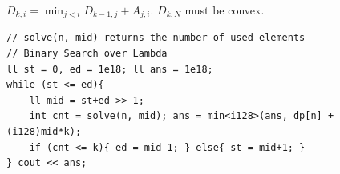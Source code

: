$D_{k,i} = \min_{j<i} D_{k-1,j} + A_{j,i}$. $D_{k,N}$ must be convex.

\begin{verbatim}
// solve(n, mid) returns the number of used elements
// Binary Search over Lambda
ll st = 0, ed = 1e18; ll ans = 1e18;
while (st <= ed){
	ll mid = st+ed >> 1;
	int cnt = solve(n, mid); ans = min<i128>(ans, dp[n] + (i128)mid*k);
	if (cnt <= k){ ed = mid-1; } else{ st = mid+1; }
} cout << ans;
\end{verbatim}